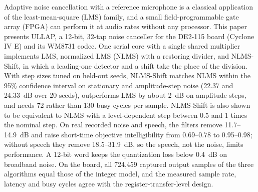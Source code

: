 Adaptive noise cancellation with a reference microphone is a classical application of the
least-mean-square (LMS) family, and a small field-programmable gate array (FPGA) can perform it at audio
rates without any processor. This paper presents ULLAP, a 12-bit, 32-tap noise canceller for the DE2-115
board (Cyclone IV E) and its WM8731 codec. One serial core with a single shared multiplier implements LMS,
normalized LMS (NLMS) with a restoring divider, and NLMS-Shift, in which a leading-one detector and a
shift take the place of the division. With step sizes tuned on held-out seeds, NLMS-Shift matches NLMS
within the 95\% confidence interval on stationary and amplitude-step noise (22.37 and 24.33~dB over 20
seeds), outperforms LMS by about 2~dB on amplitude steps, and needs 72 rather than 130 busy cycles per
sample. NLMS-Shift is also shown to be equivalent to NLMS with a level-dependent step between 0.5 and 1
times the nominal step. On real recorded noise and speech, the filters remove 11.7--14.9~dB and raise
short-time objective intelligibility from 0.69--0.78 to 0.95--0.98; without speech they remove
18.5--31.9~dB, so the speech, not the noise, limits performance. A 12-bit word keeps the quantization loss
below 0.4~dB on broadband noise. On the board, all 724,459 captured output samples of the three
algorithms equal those of the integer model, and the measured sample rate, latency and busy cycles agree
with the register-transfer-level design.
